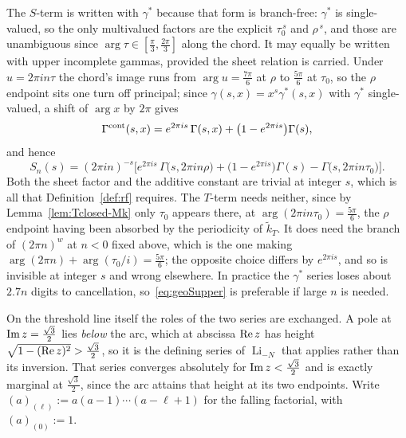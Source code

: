 \documentclass[11pt]{article}
\newcommand{\tk}{\widetilde{k}_T}
\DeclareMathOperator{\Li}{Li}
\begin{document}
The $S$-term is written with $\gamma^*$ because that form is branch-free: $\gamma^*$ is
single-valued, so the only multivalued factors are the explicit $\tau_0^{\,s}$ and $\rho^{\,s}$,
and those are unambiguous since $\arg\tau\in[\tfrac{\pi}{3},\tfrac{2\pi}{3}]$ along the chord. It
may equally be written with upper incomplete gammas, provided the sheet relation is carried. Under
$u=2\pi in\tau$ the chord's image runs from $\arg u=\tfrac{7\pi}{6}$ at $\rho$ to
$\tfrac{5\pi}{6}$ at $\tau_0$, so the $\rho$ endpoint sits one turn off principal; since
$\gamma(s,x)=x^{s}\gamma^*(s,x)$ with $\gamma^*$ single-valued, a shift of $\arg x$ by $2\pi$ gives
\begin{equation}\label{eq:sheet}
\Gamma^{\rm cont}(s,x)=e^{2\pi is}\,\Gamma(s,x)+\big(1-e^{2\pi is}\big)\Gamma(s),
\end{equation}
and hence
\begin{equation}\label{eq:geoSupper}
S_n(s)=(2\pi in)^{-s}\Big[e^{2\pi is}\,\Gamma\big(s,2\pi in\rho\big)
+\big(1-e^{2\pi is}\big)\Gamma(s)-\Gamma\big(s,2\pi in\tau_0\big)\Big].
\end{equation}
Both the sheet factor and the additive constant are trivial at integer $s$, which is all that
Definition~\ref{def:rf} requires. The $T$-term needs neither, since by
Lemma~\ref{lem:Tclosed-Mk} only $\tau_0$ appears there, at $\arg(2\pi in\tau_0)=\tfrac{5\pi}{6}$,
the $\rho$ endpoint having been absorbed by the periodicity of $\tk$. It does need the branch of
$(2\pi n)^{w}$ at $n<0$ fixed above, which is the one making
$\arg(2\pi n)+\arg(\tau_0/i)=\tfrac{5\pi}{6}$; the opposite choice differs by $e^{2\pi is}$, and so
is invisible at integer $s$ and wrong elsewhere. In practice the $\gamma^*$
series loses about $2.7n$ digits to cancellation, so~\eqref{eq:geoSupper} is preferable if large
$n$ is needed.

On the threshold line itself the roles of the two series are exchanged. A pole at
${\rm Im}\,z=\tfrac{\sqrt3}{2}$ lies \emph{below} the arc, which at abscissa ${\rm Re}\,z$ has
height $\sqrt{1-({\rm Re}\,z)^{2}}>\tfrac{\sqrt3}{2}$, so it is the defining series of $\Li_{-N}$
that applies rather than its inversion. That series converges absolutely for
${\rm Im}\,z<\tfrac{\sqrt3}{2}$ and is exactly marginal at $\tfrac{\sqrt3}{2}$, since the arc
attains that height at its two endpoints. Write $(a)_{(\ell)}:=a(a-1)\cdots(a-\ell+1)$ for the
falling factorial, with $(a)_{(0)}:=1$.
\end{document}
